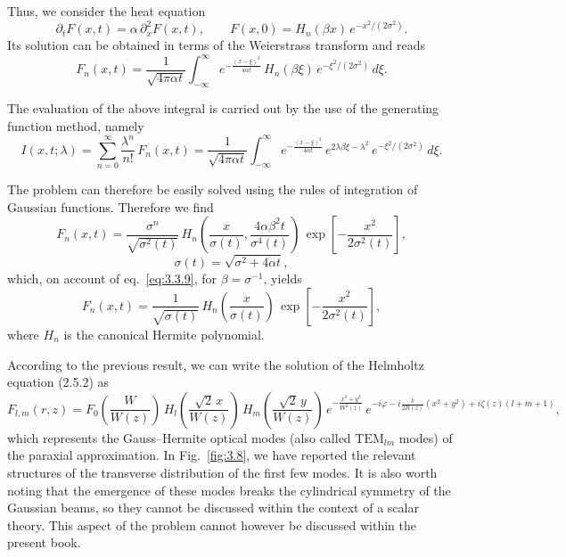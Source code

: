 Thus, we consider the heat equation
\begin{equation}
\partial_t F(x,t)=\alpha\,\partial_x^2 F(x,t),\qquad
F(x,0)=H_n(\beta x)\,e^{-x^2/(2\sigma^2)}.
\label{eq:3.8.1}
\end{equation}
Its solution can be obtained in terms of the Weierstrass transform
and reads
\begin{equation}
F_n(x,t)=\frac{1}{\sqrt{4\pi\alpha t}}
\int_{-\infty}^{\infty}
e^{-\frac{(x-\xi)^2}{4\alpha t}}\,
H_n(\beta\xi)\,e^{-\xi^2/(2\sigma^2)}\,d\xi.
\label{eq:3.8.2}
\end{equation}

The evaluation of the above integral is carried out by the use of
the generating function method, namely
\[
I(x,t;\lambda)=\sum_{n=0}^{\infty}\frac{\lambda^n}{n!}\,F_n(x,t)
=\frac{1}{\sqrt{4\pi\alpha t}}
 \int_{-\infty}^{\infty}
 e^{-\frac{(x-\xi)^2}{4\alpha t}}\,
 e^{2\lambda\beta\xi-\lambda^2}\,
 e^{-\xi^2/(2\sigma^2)}\,d\xi.
\]

The problem can therefore be easily solved using the rules of
integration of Gaussian functions. Therefore we find
\[
F_n(x,t)=
\frac{\sigma^n}{\sqrt{\sigma^2(t)}}\,
H_n\!\left(\frac{x}{\sigma(t)},\frac{4\alpha\beta^2 t}{\sigma^4(t)}\right)\,
\exp\!\left[-\frac{x^2}{2\sigma^2(t)}\right],
\]
\begin{equation}
\sigma(t)=\sqrt{\sigma^2+4\alpha t},
\label{eq:3.8.4}
\end{equation}
which, on account of eq.~\eqref{eq:3.3.9}, for
$\beta=\sigma^{-1}$, yields
\begin{equation}
F_n(x,t)=
\frac{1}{\sqrt{\sigma(t)}}\,
H_n\!\left(\frac{x}{\sigma(t)}\right)\,
\exp\!\left[-\frac{x^2}{2\sigma^2(t)}\right],
\label{eq:3.8.5}
\end{equation}
where $H_n$ is the canonical Hermite polynomial.

According to the previous result, we can write the solution of the
Helmholtz equation (2.5.2) as
\begin{equation}
F_{l,m}(r,z)=
F_0\!\left(\frac{W}{W(z)}\right)\,
H_l\!\left(\frac{\sqrt{2}\,x}{W(z)}\right)\,
H_m\!\left(\frac{\sqrt{2}\,y}{W(z)}\right)\,
e^{-\frac{x^2+y^2}{W^2(z)}}\,
e^{-i\varphi-i\frac{k}{2R(z)}(x^2+y^2)+i\zeta(z)(l+m+1)},
\label{eq:3.8.6}
\end{equation}
which represents the Gauss--Hermite optical modes (also called
$\mathrm{TEM}_{lm}$ modes) of the paraxial approximation. In
Fig.~\ref{fig:3.8}, we have reported the relevant structures of the
transverse distribution of the first few modes. It is also worth
noting that the emergence of these modes breaks the cylindrical
symmetry of the Gaussian beams, so they cannot be discussed within
the context of a scalar theory. This aspect of the problem cannot
however be discussed within the present book.

